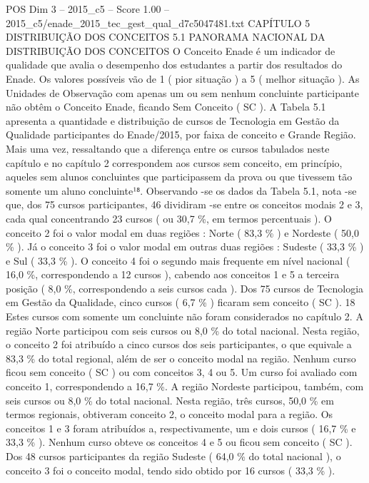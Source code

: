 \begin{textsample}{POS Dim 3 – 2015\_c5 – Score 1.00 – 2015\_c5/enade\_2015\_tec\_gest\_qual\_d7c5047481.txt}  \label{ex:f3_pos_222}
CAPÍTULO 5 DISTRIBUIÇÃO DOS CONCEITOS 5.1 PANORAMA NACIONAL DA DISTRIBUIÇÃO DOS CONCEITOS O Conceito Enade é um indicador de qualidade que avalia o desempenho dos estudantes a partir dos resultados do Enade.
Os valores possíveis vão de 1 ( pior situação ) a 5 ( melhor situação ).
As Unidades de Observação com apenas um ou sem nenhum concluinte participante não obtêm o Conceito Enade, ficando Sem Conceito ( SC ).
A Tabela 5.1 apresenta a quantidade e distribuição de cursos de Tecnologia em Gestão da Qualidade participantes do Enade/2015, por faixa de conceito e Grande Região.
Mais uma vez, ressaltando que a diferença entre os cursos tabulados neste capítulo e no capítulo 2 correspondem aos cursos sem conceito, em princípio, aqueles sem alunos concluintes que participassem da prova ou que tivessem tão somente um aluno concluinte¹⁸.
Observando -se os dados da Tabela 5.1, nota -se que, dos 75 cursos participantes, 46 dividiram -se entre os conceitos modais 2 e 3, cada qual concentrando 23 cursos ( ou 30,7 \%, em termos percentuais ).
O conceito 2 foi o valor modal em duas regiões : Norte ( 83,3 \% ) e Nordeste ( 50,0 \% ).
Já o conceito 3 foi o valor modal em outras duas regiões : Sudeste ( 33,3 \% ) e Sul ( 33,3 \% ).
O conceito 4 foi o segundo mais frequente em nível nacional ( 16,0 \%, correspondendo a 12 cursos ), cabendo aos conceitos 1 e 5 a terceira posição ( 8,0 \%, correspondendo a seis cursos cada ).
Dos 75 cursos de Tecnologia em Gestão da Qualidade, cinco cursos ( 6,7 \% ) ficaram sem conceito ( SC ). 18 Estes cursos com somente um concluinte não foram considerados no capítulo 2.
A região Norte participou com seis cursos ou 8,0 \% do total nacional.
Nesta região, o conceito 2 foi atribuído a cinco cursos dos seis participantes, o que equivale a 83,3 \% do total regional, além de ser o conceito modal na região.
Nenhum curso ficou sem conceito ( SC ) ou com conceitos 3, 4 ou 5.
Um curso foi avaliado com conceito 1, correspondendo a 16,7 \%.
A região Nordeste participou, também, com seis cursos ou 8,0 \% do total nacional.
Nesta região, três cursos, 50,0 \% em termos regionais, obtiveram conceito 2, o conceito modal para a região.
Os conceitos 1 e 3 foram atribuídos a, respectivamente, um e dois cursos ( 16,7 \% e 33,3 \% ).
Nenhum curso obteve os conceitos 4 e 5 ou ficou sem conceito ( SC ).
Dos 48 cursos participantes da região Sudeste ( 64,0 \% do total nacional ), o conceito 3 foi o conceito modal, tendo sido obtido por 16 cursos ( 33,3 \% ).

\end{textsample}
